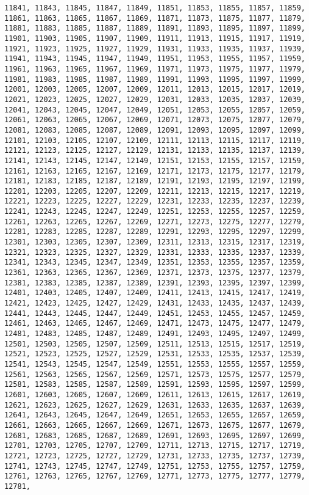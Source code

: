 \documentclass[11pt]{article}
\begin{document}
\begin{Verbatim}[commandchars=\\\{\}]
11841, 11843, 11845, 11847, 11849, 11851, 11853, 11855, 11857, 11859, 11861, 11863, 11865, 11867, 11869, 11871, 11873, 11875, 11877, 11879, 11881, 11883, 11885, 11887, 11889, 11891, 11893, 11895, 11897, 11899, 11901, 11903, 11905, 11907, 11909, 11911, 11913, 11915, 11917, 11919, 11921, 11923, 11925, 11927, 11929, 11931, 11933, 11935, 11937, 11939, 11941, 11943, 11945, 11947, 11949, 11951, 11953, 11955, 11957, 11959, 11961, 11963, 11965, 11967, 11969, 11971, 11973, 11975, 11977, 11979, 11981, 11983, 11985, 11987, 11989, 11991, 11993, 11995, 11997, 11999, 12001, 12003, 12005, 12007, 12009, 12011, 12013, 12015, 12017, 12019, 12021, 12023, 12025, 12027, 12029, 12031, 12033, 12035, 12037, 12039, 12041, 12043, 12045, 12047, 12049, 12051, 12053, 12055, 12057, 12059, 12061, 12063, 12065, 12067, 12069, 12071, 12073, 12075, 12077, 12079, 12081, 12083, 12085, 12087, 12089, 12091, 12093, 12095, 12097, 12099, 12101, 12103, 12105, 12107, 12109, 12111, 12113, 12115, 12117, 12119, 12121, 12123, 12125, 12127, 12129, 12131, 12133, 12135, 12137, 12139, 12141, 12143, 12145, 12147, 12149, 12151, 12153, 12155, 12157, 12159, 12161, 12163, 12165, 12167, 12169, 12171, 12173, 12175, 12177, 12179, 12181, 12183, 12185, 12187, 12189, 12191, 12193, 12195, 12197, 12199, 12201, 12203, 12205, 12207, 12209, 12211, 12213, 12215, 12217, 12219, 12221, 12223, 12225, 12227, 12229, 12231, 12233, 12235, 12237, 12239, 12241, 12243, 12245, 12247, 12249, 12251, 12253, 12255, 12257, 12259, 12261, 12263, 12265, 12267, 12269, 12271, 12273, 12275, 12277, 12279, 12281, 12283, 12285, 12287, 12289, 12291, 12293, 12295, 12297, 12299, 12301, 12303, 12305, 12307, 12309, 12311, 12313, 12315, 12317, 12319, 12321, 12323, 12325, 12327, 12329, 12331, 12333, 12335, 12337, 12339, 12341, 12343, 12345, 12347, 12349, 12351, 12353, 12355, 12357, 12359, 12361, 12363, 12365, 12367, 12369, 12371, 12373, 12375, 12377, 12379, 12381, 12383, 12385, 12387, 12389, 12391, 12393, 12395, 12397, 12399, 12401, 12403, 12405, 12407, 12409, 12411, 12413, 12415, 12417, 12419, 12421, 12423, 12425, 12427, 12429, 12431, 12433, 12435, 12437, 12439, 12441, 12443, 12445, 12447, 12449, 12451, 12453, 12455, 12457, 12459, 12461, 12463, 12465, 12467, 12469, 12471, 12473, 12475, 12477, 12479, 12481, 12483, 12485, 12487, 12489, 12491, 12493, 12495, 12497, 12499, 12501, 12503, 12505, 12507, 12509, 12511, 12513, 12515, 12517, 12519, 12521, 12523, 12525, 12527, 12529, 12531, 12533, 12535, 12537, 12539, 12541, 12543, 12545, 12547, 12549, 12551, 12553, 12555, 12557, 12559, 12561, 12563, 12565, 12567, 12569, 12571, 12573, 12575, 12577, 12579, 12581, 12583, 12585, 12587, 12589, 12591, 12593, 12595, 12597, 12599, 12601, 12603, 12605, 12607, 12609, 12611, 12613, 12615, 12617, 12619, 12621, 12623, 12625, 12627, 12629, 12631, 12633, 12635, 12637, 12639, 12641, 12643, 12645, 12647, 12649, 12651, 12653, 12655, 12657, 12659, 12661, 12663, 12665, 12667, 12669, 12671, 12673, 12675, 12677, 12679, 12681, 12683, 12685, 12687, 12689, 12691, 12693, 12695, 12697, 12699, 12701, 12703, 12705, 12707, 12709, 12711, 12713, 12715, 12717, 12719, 12721, 12723, 12725, 12727, 12729, 12731, 12733, 12735, 12737, 12739, 12741, 12743, 12745, 12747, 12749, 12751, 12753, 12755, 12757, 12759, 12761, 12763, 12765, 12767, 12769, 12771, 12773, 12775, 12777, 12779, 12781, 
\end{Verbatim}
\end{document}
